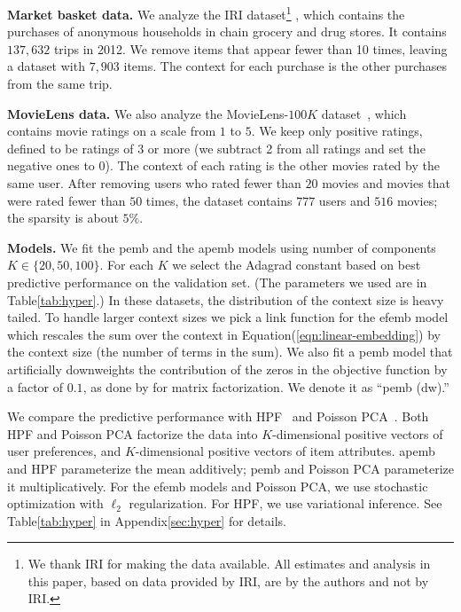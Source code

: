 \documentclass[12pt]{article}
\DeclareRobustCommand{\parhead}[1]{\vspace{0.05in} \textbf{#1} }
\begin{document}
\parhead{Market basket data.} We analyze the IRI dataset\footnote{We
  thank IRI for making
  the data available. All estimates and analysis in this paper, based
  on data provided by IRI, are by the authors and not by IRI.}
\citep{Bronnenberg2008}, which contains the purchases of anonymous
households in chain grocery and drug stores. It contains $137,632$
trips in 2012. We remove items that appear fewer than 10 times,
leaving a dataset with $7,903$ items. The context for each purchase is
the other purchases from the same trip.

\parhead{MovieLens data.} We also analyze the MovieLens-$100K$
dataset~\citep{harper2015movielens}, which contains movie ratings on a
scale from $1$ to $5$. We keep only positive ratings, defined to be
ratings of 3 or more (we subtract 2 from all ratings and set the negative ones to 0). 
The context of each rating is the other movies rated by the same user. After
removing users who rated fewer than $20$ movies
and movies that were rated fewer than $50$ times, the dataset contains
$777$ users and $516$ movies; the sparsity is about $5\%$.

\parhead{Models.} We fit the \gls{pemb} and the \gls{apemb} models
using number of components $K \in \{20, 50, 100\}$. 
For each $K$ we select the Adagrad constant based on best predictive 
performance on the validation set. (The parameters we used are in Table\nobreakspace \ref {tab:hyper}.)  
In these datasets, the distribution of the context size is heavy tailed. To handle
larger context sizes we pick a link function for the \gls{efemb}
model which rescales the sum over the context in Equation\nobreakspace \textup {(\ref {eqn:linear-embedding})} by the
context size (the number of terms in the sum).
We also fit a \gls{pemb} model that artificially downweights the contribution of
the zeros in the objective function by a factor of $0.1$, 
as done by \citet{hu2008} for matrix factorization.
We denote it as ``\gls{pemb} (dw).''

We compare the predictive performance with
\gls{HPF}~\citep{Gopalan2015} and Poisson
\gls{PCA}~\citep{collins2001generalization}. Both \gls{HPF} and
Poisson \gls{PCA} factorize the data into $K$-dimensional positive vectors of user
preferences, and $K$-dimensional positive vectors of item attributes.
\gls{apemb} and \gls{HPF} parameterize the mean additively; \gls{pemb}
and Poisson \gls{PCA} parameterize it multiplicatively. For the
\gls{efemb} models and Poisson \gls{PCA}, we use stochastic
optimization with $\ell_2$ regularization. For \gls{HPF}, we use
variational inference. See Table\nobreakspace \ref {tab:hyper} in Appendix\nobreakspace \ref {sec:hyper} for
details.
\end{document}
